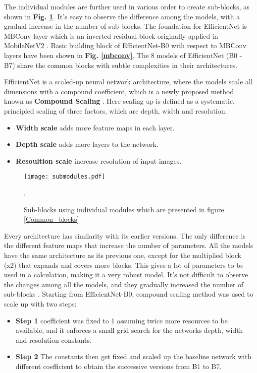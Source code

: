 \documentclass[conference]{IEEEtran}
\begin{document}
The individual modules are further used in various order to create sub-blocks, as shown in \textbf{Fig. \ref{submodules}}. It’s easy to observe the difference among the models, with a gradual increase in the number of sub-blocks. The foundation for EfficientNet is MBConv layer which is an inverted residual block originally applied in MobileNetV2 \cite{sandler2018mobilenetv2}. Basic building block of EfficientNet-B0 with respect to MBConv layers have been shown in \textbf{Fig. \ref{mbconv}}. The 8 models of EfficientNet (B0 - B7) share the common blocks with subtle complexities in their architectures. 

EfficientNet is a scaled-up neural network architecture, where the models scale all dimensions with a compound coefficient, which is a newly proposed method known as \textbf{Compound Scaling} \cite{lee2020compounding}. Here scaling up is defined as a systematic, principled scaling of three factors, which are depth, width and resolution.

\begin{samepage}
\begin{itemize}
    \item \textbf{Width scale} adds more feature maps in each layer.
    \item \textbf{Depth scale} adds more layers to the network.
    \item \textbf{Resoultion scale} increase resolution of input images.
\end{itemize}
\end{samepage}

\begin{figure}[h!]
    \centering
    \texttt{[image: submodules.pdf]}
    \caption{Sub-blocks using individual modules which are presented in figure \ref{Common_blocks}}.
    \label{submodules}
\end{figure}

Every architecture has similarity with its earlier versions. The only difference is the different feature maps that increase the number of parameters. All the models have the same architecture as its previous one, except for the multiplied block (x2) that expands and covers more blocks. This gives a lot of parameters to be used in a calculation, making it a very robust model.
It’s not difficult to observe the changes among all the models, and they gradually increased the number of sub-blocks \cite{tan2019efficientnet}. Starting from EfficientNet-B0, compound scaling method was used to scale up with two steps:
\begin{itemize}
    \item \textbf{Step 1} coefficient was fixed to 1 assuming twice more resources to be available, and it enforces a small grid search for the networks depth, width and resolution constants.
    \item \textbf{Step 2} The constants then get fixed and scaled up the baseline network with different coefficient to obtain the successive versions from B1 to B7.
\end{itemize}
\end{document}
